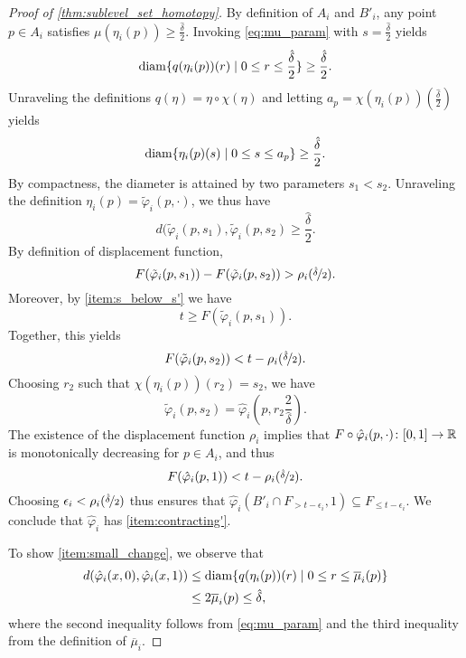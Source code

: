 \begin{proof}[Proof of \cref{thm:sublevel_set_homotopy}]
	By definition of $A_i$ and $B'_{i}$, any point $p \in A_i$ satisfies
	$\mu(\eta_{i}(p)) \geq \frac{\hat{\delta}}{2}$.
	Invoking
	\cref{eq:mu_param} with $s = \frac{\hat{\delta}}{2}$ yields
	\[
	\operatorname{diam}\{q(\eta_{i}(p))(r) \mid 0 \leq r \leq \frac{\hat{\delta}}{2}\} \geq \frac{\hat{\delta}}{2}.
	\]
	Unraveling the definitions $q(\eta) = \eta \circ \chi(\eta)$
	and letting $a_p = \chi(\eta_{i}(p))(\frac{\hat{\delta}}{2})$
	yields
	\[
	\operatorname{diam}\{\eta_{i}(p)(s) \mid 0 \leq s \leq a_p\} \geq \frac{\hat{\delta}}{2}.
	\]
%
%
	By compactness, the diameter is attained by two parameters $s_1<s_2$.
	Unraveling the definition $\eta_{i}(p)=\tilde{\varphi}_{i}(p,\cdot)$,
	we thus have
	\[
	d(\tilde{\varphi}_{i}(p,s_1), \tilde{\varphi}_{i}(p,s_2) \geq \frac{\hat{\delta}}{2}.\]
	By definition of displacement function,
	\[F(\tilde{\varphi}_{i}(p,s_1)) - F(\tilde{\varphi}_{i}(p,s_2)) > \rho_{i}(\nicefrac{\hat{\delta}}{2}).\]
	Moreover, by \cref{item:s_below_s'} we have
	\[
	t \geq F(\tilde{\varphi}_{i}(p,s_1)).
	\]
	Together, this yields
	\[F(\tilde{\varphi}_{i}(p,s_2)) < t - \rho_{i}(\nicefrac{\hat{\delta}}{2}).\]
	Choosing $r_2$ such that $\chi(\eta_{i}(p))(r_2)= s_2$,
	we have
	\[\tilde{\varphi}_{i}(p,s_2) =
	\hat{\varphi}_{i}(p,r_2\frac{2}{\hat{\delta}}).
	\]
	The existence of the displacement function $\rho_i$ implies that $F \circ \hat{\varphi}_i(p,\cdot) \colon [0,1] \to \mathbb{R}$ is monotonically decreasing for $p \in A_i$, and thus
	\[F(\hat{\varphi}_{i}(p,1)) < t - \rho_{i}(\nicefrac{\hat{\delta}}{2}).\]
	Choosing $\epsilon_i < \rho_{i}(\nicefrac{\hat{\delta}}{2})$ thus ensures that $\hat{\varphi}_{i}(B'_{i} \cap F_{> t-\epsilon_{i}},1) \subseteq F_{\leq t-\epsilon_{i}}$.
	We conclude that $\hat{\varphi}_{i}$ has \cref{item:contracting'}.



	To show \cref{item:small_change}, we observe that
	\begin{align*}
	d(\hat{\varphi}_{i}(x, 0), \hat{\varphi}_{i}(x,1)) &\leq
	\diam\{q(\eta_{i}(p))(r) \mid 0 \leq r \leq \overline{\mu}_{i}(p)\} \\
	&
	\leq 2 \overline{\mu}_{i}(p)%
	\leq\hat{\delta},
	\end{align*}
	where the second inequality follows from \cref{eq:mu_param} and the third inequality from the definition of $\overline{\mu}_{i}$.


\end{proof}
